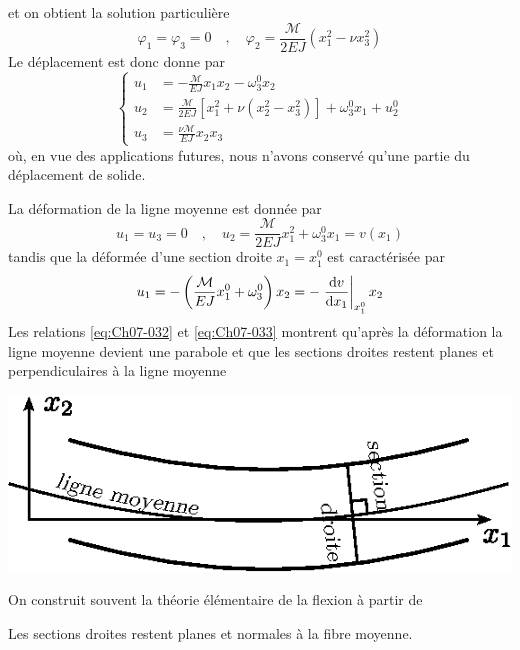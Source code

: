 et on obtient la solution particulière 
\begin{equation}
    \varphi_1 = \varphi_3 = 0 \quad , \quad \varphi_2 = \frac{\mathcal{M}}{2EJ} \left( x_1^2 - \nu x_3^2 \right)
    \label{eq:Ch07-030}
\end{equation}
Le déplacement est donc donne par
\begin{equation}
    \left\{
    \begin{aligned}
        u_1 & = -\frac{\mathcal{M}}{EJ} x_1x_2 -\omega_3^0x_2 \\
        u_2 & = \frac{\mathcal{M}}{2EJ} \left[ x_1^2 + \nu \left( x_2^2 - x_3^2 \right) \right] +\omega_3^0x_1 +u_2^0 \\
        u_3 & = \frac{\nu\mathcal{M}}{EJ} x_2x_3
    \end{aligned}
    \right.
    \label{eq:Ch07-031}
\end{equation}
où, en vue des applications futures, nous n'avons conservé qu'une partie du déplacement de solide.

La déformation de la ligne moyenne est donnée par
\begin{equation}
    u_1 = u_3 = 0 \quad , \quad u_2 = \frac{\mathcal{M}}{2EJ}x_1^2 + \omega_3^0 x_1 = v(x_1)
    \label{eq:Ch07-032}
\end{equation}
tandis que la déformée d'une section droite $x_1=x_1^0$ est caractérisée par
\begin{equation}
    u_1 = - \left( \frac{\mathcal{M}}{EJ}x_1^0 + \omega_3^0 \right) x_2 = - \left.\frac{\mathrm{d} v}{\mathrm{d} x_1}\right|_{x_1^0} x_2
    \label{eq:Ch07-033}
\end{equation}
Les relations \eqref{eq:Ch07-032} et \eqref{eq:Ch07-033} montrent qu'après la déformation la ligne moyenne devient une parabole et que les sections droites restent planes et perpendiculaires à la ligne moyenne
\begin{center}
    \includegraphics{../images/T1_Ch07-06}
\end{center}

On construit souvent la théorie élémentaire de la flexion à partir de
\begin{Hypothese}
    Les sections droites restent planes et normales à la fibre moyenne.
\end{Hypothese}

